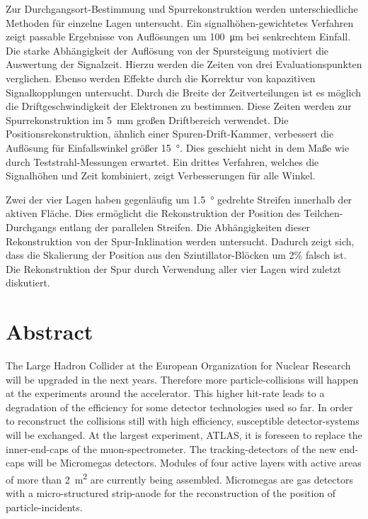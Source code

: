 \documentclass[
twoside,            %
BCOR1.4cm,          %
10pt,               %
headings=normal,    %
headsepline,        %
clearplainpage,		%
final,              %
div=14,
open=right,
bibliography=toc
]{scrreprt}
\begin{document}
Zur Durchgangsort-Bestimmung und Spurrekonstruktion werden unterschiedliche Methoden f\"ur einzelne Lagen untersucht.
Ein signalh\"ohen-gewichtetes Verfahren zeigt passable Ergebnisse von Aufl\"osungen um \SI{100}{\micro\m} bei senkrechtem Einfall.
Die starke Abh\"angigkeit der Aufl\"osung von der Spursteigung motiviert die Auswertung der Signalzeit.
Hierzu werden die Zeiten von drei Evaluationspunkten verglichen.
Ebenso werden Effekte durch die Korrektur von kapazitiven Signalkopplungen untersucht.
Durch die Breite der Zeitverteilungen ist es m\"oglich die Driftgeschwindigkeit der Elektronen zu bestimmen.
Diese Zeiten werden zur Spurrekonstruktion im \SI{5}{mm} gro\ss en Driftbereich verwendet.
Die Positionsrekonstruktion, \"ahnlich einer Spuren-Drift-Kammer, verbessert die Aufl\"osung f\"ur Einfallswinkel gr\"o\ss er \SI{15}{\degree}.
Dies geschieht nicht in dem Ma\ss e wie durch Teststrahl-Messungen erwartet.
Ein drittes Verfahren, welches die Signalh\"ohen und Zeit kombiniert, zeigt Verbesserungen f\"ur alle Winkel.

Zwei der vier Lagen haben gegenl\"aufig um \SI{1.5}{\degree} gedrehte Streifen innerhalb der aktiven Fl\"ache.
Dies erm\"oglicht die Rekonstruktion der Position des Teilchen-Durchgangs entlang der parallelen Streifen.
Die Abh\"angigkeiten dieser Rekonstruktion von der Spur-Inklination werden untersucht.
Dadurch zeigt sich, dass die Skalierung der Position aus den Szintillator-Bl\"ocken um 2\% falsch ist.
Die Rekonstruktion der Spur durch Verwendung aller vier Lagen wird zuletzt diskutiert.

\chapter*{Abstract}

The Large Hadron Collider at the European Organization for Nuclear Research will be upgraded in the next years.
Therefore more particle-collisions will happen at the experiments around the accelerator.
This higher hit-rate leads to a degradation of the efficiency for some detector technologies used so far.
In order to reconstruct the collisions still with high efficiency, susceptible detector-systems will be exchanged.
At the largest experiment, ATLAS, it is foreseen to replace the inner-end-caps of the muon-spectrometer.
The tracking-detectors of the new end-caps will be Micromegas detectors.
Modules of four active layers with active areas of more than \SI{2}{\square\m} are currently being assembled.
Micromegas are gas detectors with a micro-structured strip-anode for the reconstruction of the position of particle-incidents.
\end{document}
